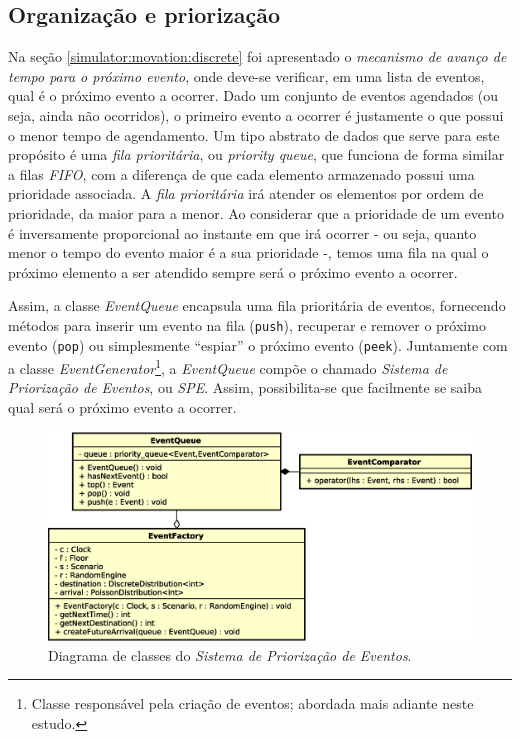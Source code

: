 \subsection{Organização e priorização}

Na seção \ref{simulator:movation:discrete} foi apresentado o \textit{mecanismo de
avanço de tempo para o próximo evento}, onde deve-se verificar, em uma lista de
eventos, qual é o próximo evento a ocorrer. Dado um conjunto de eventos
agendados (ou seja, ainda não ocorridos), o primeiro evento a ocorrer é
justamente o que possui o menor tempo de agendamento. Um tipo abstrato de dados
que serve para este propósito é uma \textit{fila prioritária}, ou
\textit{priority queue}, que funciona de forma similar a filas \textit{FIFO},
com a diferença de que cada elemento armazenado possui uma prioridade associada.
A \textit{fila prioritária} irá atender os elementos por ordem de prioridade, da
maior para a menor. Ao considerar que a prioridade de um evento é inversamente
proporcional ao instante em que irá ocorrer - ou seja, quanto menor o tempo do
evento maior é a sua prioridade -, temos uma fila na qual o próximo elemento a
ser atendido sempre será o próximo evento a ocorrer.

Assim, a classe \textit{EventQueue} encapsula uma fila prioritária de eventos,
fornecendo métodos para inserir um evento na fila (\texttt{push}), recuperar e
remover o próximo evento (\texttt{pop}) ou simplesmente ``espiar'' o próximo
evento (\texttt{peek}). Juntamente com a classe
\textit{EventGenerator}\footnote{Classe responsável pela criação de eventos;
abordada mais adiante neste estudo.}, a \textit{EventQueue} compõe o chamado
\textit{Sistema de Priorização de Eventos}, ou \textit{SPE}. Assim,
possibilita-se que facilmente se saiba qual será o próximo evento a ocorrer.

\begin{figure}[htb!]
  \centering
  \includegraphics[scale=0.6]{img/EventQueue.eps}
  \caption{Diagrama de classes do \textit{Sistema de Priorização de Eventos}.}
\label{fig:diagram:event:manage}
\end{figure}

